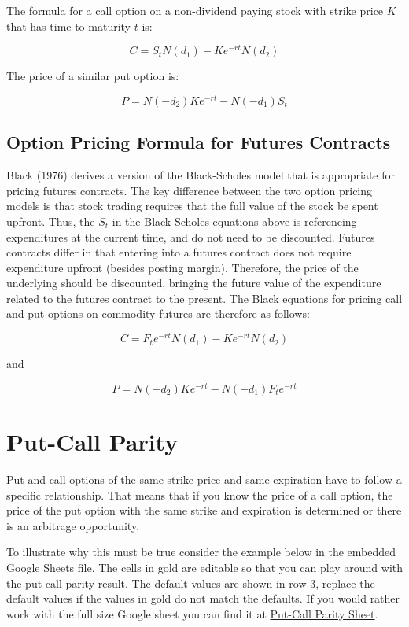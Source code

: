 \documentclass[
  letterpaper,
  DIV=11,
  numbers=noendperiod]{scrreprt}
\begin{document}
The formula for a call option on a non-dividend paying stock with strike
price \(K\) that has time to maturity \(t\) is:

\[C = S_{t}N(d_{1}) - K e^{-rt} N(d_{2})\]

The price of a similar put option is:

\[
P = N(-d_{2}) K e^{-rt} - N(-d_{1}) S_{t}
\]

\hypertarget{option-pricing-formula-for-futures-contracts}{%
\subsection{Option Pricing Formula for Futures
Contracts}\label{option-pricing-formula-for-futures-contracts}}

Black (1976) derives a version of the Black-Scholes model that is
appropriate for pricing futures contracts. The key difference between
the two option pricing models is that stock trading requires that the
full value of the stock be spent upfront. Thus, the \(S_{t}\) in the
Black-Scholes equations above is referencing expenditures at the current
time, and do not need to be discounted. Futures contracts differ in that
entering into a futures contract does not require expenditure upfront
(besides posting margin). Therefore, the price of the underlying should
be discounted, bringing the future value of the expenditure related to
the futures contract to the present. The Black equations for pricing
call and put options on commodity futures are therefore as follows:

\[
C = F_{t} e^{-rt} N(d_{1}) - K e^{-rt} N(d_{2})
\]

and

\[
P = N(-d_{2}) K e^{-rt} - N(-d_{1}) F_{t} e^{-rt}
\]

\hypertarget{put-call-parity}{%
\section{Put-Call Parity}\label{put-call-parity}}

Put and call options of the same strike price and same expiration have
to follow a specific relationship. That means that if you know the price
of a call option, the price of the put option with the same strike and
expiration is determined or there is an arbitrage opportunity.

To illustrate why this must be true consider the example below in the
embedded Google Sheets file. The cells in gold are editable so that you
can play around with the put-call parity result. The default values are
shown in row 3, replace the default values if the values in gold do not
match the defaults. If you would rather work with the full size Google
sheet you can find it at
\href{https://docs.google.com/spreadsheets/d/1ivvTGqC9R4L3zkG8c4ApDg8dC1LHj4v_8uLjgiurxX0/edit?usp=sharing}{Put-Call
Parity Sheet}.
\end{document}
